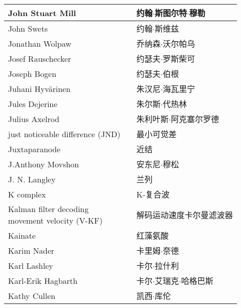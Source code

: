 \begin{longtable}{lll}
	\midrule
	John Stuart Mill   && 约翰$\cdot$斯图尔特$\cdot$穆勒  \\
	
	\midrule
	John Swets   && 约翰$\cdot$斯维兹  \\
	
	\midrule
	Jonathan Wolpaw   && 乔纳森$\cdot$沃尔帕乌  \\
	
	\midrule
	Josef Rauschecker   && 约瑟夫$\cdot$罗斯柴可  \\
	
	\midrule
	Joseph Bogen   && 约瑟夫$\cdot$伯根  \\
	
	\midrule
	Juhani Hyvärinen   && 朱汉尼$\cdot$海瓦里宁  \\
	
	\midrule
	Jules Dejerine   && 朱尔斯$\cdot$代热林  \\
	
	\midrule
	Julius Axelrod   && 朱利叶斯$\cdot$阿克塞尔罗德  \\
	
	\midrule
	just noticeable difference (JND)   && 最小可觉差  \\
	
	\midrule
	Juxtaparanode   && 近结  \\
	
	\midrule
	J.Anthony Movshon   && 安东尼$\cdot$穆松  \\
	
	\midrule
	J. N. Langley   && 兰列  \\
	
	\midrule
	K complex   && K-复合波  \\
	
	\midrule
	\makecell[l]{Kalman filter decoding \\movement velocity (V-KF)}   && 解码运动速度卡尔曼滤波器  \\
	
	\midrule
	Kainate   && 红藻氨酸  \\
	
	\midrule
	Karim Nader   && 卡里姆$\cdot$奈德  \\
	
	\midrule
	Karl Lashley  && 卡尔$\cdot$拉什利  \\
	
	\midrule
	Karl-Erik Hagbarth  && 卡尔$\cdot$艾瑞克$\cdot$哈格巴斯  \\
	
	\midrule
	Kathy Cullen  && 凯西$\cdot$库伦  \\
	

\end{longtable}
